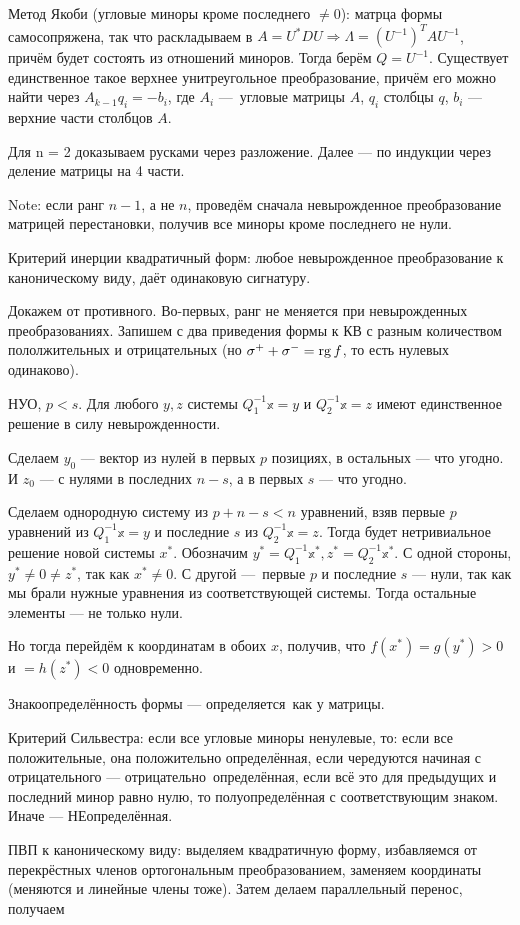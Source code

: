 \documentclass[12pt, a4paper]{article}
\begin{document}
Метод Якоби (угловые миноры кроме последнего $\neq 0$): матрца формы самосопряжена, 
так что раскладываем в $A = U^*DU \Rightarrow \Lambda = (U^{-1})^T A U^{-1}$, причём будет состоять из отношений миноров.
Тогда берём $Q = U^{-1}$.
Существует единственное такое верхнее унитреугольное преобразование, причём его можно найти через $A_{k -1} q_i = -b_i$, где $A_i$ — угловые матрицы $A$, $q_i$ столбцы $q$, $b_i$ — верхние части столбцов $A$.

Для n = 2 доказываем русками через разложение. Далее — по индукции через деление матрицы на 4 части.

Note: если ранг $n - 1$, а не $n$, проведём сначала невырожденное преобразование матрицей перестановки, получив все миноры кроме последнего не нули.



Критерий инерции квадратичный форм: любое невырожденное преобразование к каноническому виду, даёт одинаковую сигнатуру.

Докажем от противного. Во-первых, ранг не меняется при невырожденных преобразованиях. 
Запишем с два приведения формы к КВ с разным количеством пололжительных и отрицательных (но $\sigma^+ + \sigma^- = \operatorname{rg} f$, то есть нулевых одинаково).

НУО, $p < s$. Для любого $y, z$ системы $Q_1^{-1} \mathbb{x} = y$ и $Q_2^{-1} \mathbb{x} = z$ имеют единственное решение в силу невырожденности.

Сделаем $y_0$ — вектор из нулей в первых $p$ позициях, в остальных — что угодно. И $z_0$ — с нулями в последних $n - s$, а в первых $s$ — что угодно.

Сделаем однородную систему из $p + n - s < n$ уравнений, взяв первые $p$ уравнений из $Q_1^{-1} \mathbb{x} = y$ 
и последние $s$ из $Q_2^{-1} \mathbb{x} = z$. Тогда будет нетривиальное решение новой системы $x^*$.
Обозначим $y^* = Q_1^{-1} \mathbb{x^*}, z^* = Q_2^{-1} \mathbb{x^*}$. С одной стороны, $y^* \neq 0 \neq z^*$, так как $x^* \neq 0$.
С другой — первые $p$ и последние $s$ — нули, так как мы брали нужные уравнения из соответствующей системы.
Тогда остальные элементы — не только нули.

Но тогда перейдём к координатам в обоих $x$, получив, что $f(x^*) = g(y^*) > 0$ и $= h(z^*) < 0$ одновременно. 

Знакоопределённость формы — определяется как у матрицы.

Критерий Сильвестра: если все угловые миноры ненулевые, то: 
если все положительные, она положительно определённая, если чередуются начиная с отрицательного — отрицательно определённая,
если всё это для предыдущих и последний минор равно нулю, то полуопределённая с соответствующим знаком. Иначе — НЕопределённая.

ПВП к каноническому виду: выделяем квадратичную форму, избавляемся от перекрёстных членов ортогональным преобразованием, заменяем координаты (меняются и линейные члены тоже).
Затем делаем параллельный перенос, получаем 
\end{document}
